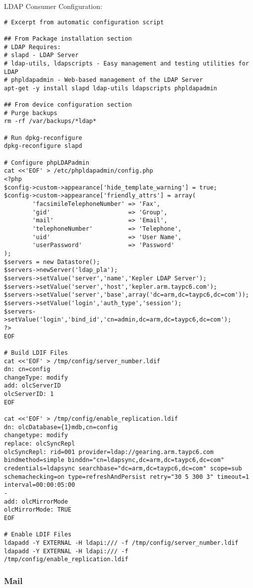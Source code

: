 \documentclass[12pt]{spieman}  %
\begin{document}
LDAP Consumer Configuration:

\begin{lstlisting}
# Excerpt from automatic configuration script

## From Package installation section
# LDAP Requires:
# slapd - LDAP Server
# ldap-utils, ldapscripts - Easy management and testing utilities for LDAP
# phpldapadmin - Web-based management of the LDAP Server
apt-get -y install slapd ldap-utils ldapscripts phpldapadmin

## From device configuration section
# Purge backups
rm -rf /var/backups/*ldap*

# Run dpkg-reconfigure
dpkg-reconfigure slapd	

# Configure phpLDAPadmin
cat <<'EOF' > /etc/phpldapadmin/config.php
<?php
$config->custom->appearance['hide_template_warning'] = true;
$config->custom->appearance['friendly_attrs'] = array(
        'facsimileTelephoneNumber' => 'Fax',
        'gid'                      => 'Group',
        'mail'                     => 'Email',
        'telephoneNumber'          => 'Telephone',
        'uid'                      => 'User Name',
        'userPassword'             => 'Password'
);
$servers = new Datastore();
$servers->newServer('ldap_pla');
$servers->setValue('server','name','Kepler LDAP Server');
$servers->setValue('server','host','kepler.arm.taypc6.com');
$servers->setValue('server','base',array('dc=arm,dc=taypc6,dc=com'));
$servers->setValue('login','auth_type','session');
$servers->setValue('login','bind_id','cn=admin,dc=arm,dc=taypc6,dc=com');
?>
EOF

# Build LDIF Files
cat <<'EOF' > /tmp/config/server_number.ldif
dn: cn=config
changeType: modify
add: olcServerID
olcServerID: 1
EOF

cat <<'EOF' > /tmp/config/enable_replication.ldif
dn: olcDatabase={1}mdb,cn=config
changetype: modify
replace: olcSyncRepl
olcSyncRepl: rid=001 provider=ldap://gearing.arm.taypc6.com bindmethod=simple binddn="cn=ldapsync,dc=arm,dc=taypc6,dc=com" credentials=ldapsync searchbase="dc=arm,dc=taypc6,dc=com" scope=sub schemachecking=on type=refreshAndPersist retry="30 5 300 3" timeout=1 interval=00:00:05:00
-
add: olcMirrorMode
olcMirrorMode: TRUE
EOF

# Enable LDIF Files
ldapadd -Y EXTERNAL -H ldapi:/// -f /tmp/config/server_number.ldif
ldapadd -Y EXTERNAL -H ldapi:/// -f /tmp/config/enable_replication.ldif
\end{lstlisting}

\subsubsection{Mail}
\label{subsubsec:mail-config}
\end{document}
